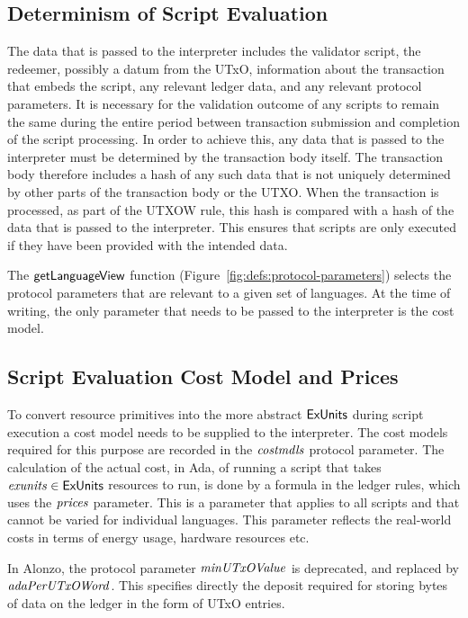 \subsection{Determinism of Script Evaluation}
\label{sec:determinism}

The data that is passed to the interpreter
includes the validator script, the redeemer, possibly a datum from the UTxO, information about the transaction that
embeds the script, any relevant ledger data, and any relevant protocol parameters.
It is necessary for the validation outcome of any scripts to remain the same during the entire
period between transaction
submission and completion of the script processing.
%
In order to achieve this,
any data that is passed to the interpreter must be determined by the transaction body itself.
The transaction body therefore includes a hash of any such data that is not uniquely determined by other parts of the transaction body or the UTXO.
When the transaction is processed, as part of the UTXOW rule, this hash is compared with a hash of the data that is passed to the interpreter. This
ensures that scripts are only executed if they have been provided with the intended data.

The $\mathsf{getLanguageView}$ function (Figure~\ref{fig:defs:protocol-parameters}) selects the protocol parameters that are relevant to
a given set of languages.
%
At the time of writing, the only parameter that needs to be passed to the interpreter is the cost model.

\subsection{Script Evaluation Cost Model and Prices}
\label{sec:cost-mod}

To convert resource primitives into the
more abstract $\mathsf{ExUnits}$ during script execution a cost model needs to be supplied to the interpreter.
The cost models required for this purpose are recorded in the $\mathit{costmdls}$ protocol parameter.
%
The calculation of the actual cost, in Ada, of running
a script that takes $\mathit{exunits} \in \mathsf{ExUnits}$ resources to run,
is done by a formula in the ledger rules, which uses the
$\mathit{prices}$ parameter. This is a parameter that applies to all
scripts and that cannot be varied for individual languages. This parameter
reflects the real-world costs in terms of energy usage, hardware resources etc.

In Alonzo, the protocol parameter $\mathit{minUTxOValue}$ is deprecated, and replaced by
$\mathit{adaPerUTxOWord}$. This specifies directly the deposit required for storing
bytes of data on the ledger in the form of UTxO entries.

